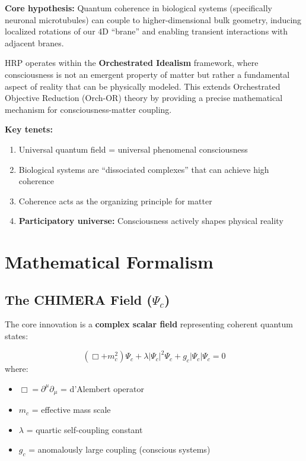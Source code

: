 \begin{keyconcept}
\textbf{Core hypothesis:} Quantum coherence in biological systems (specifically neuronal microtubules) can couple to higher-dimensional bulk geometry, inducing localized rotations of our 4D ``brane'' and enabling transient interactions with adjacent branes.
\end{keyconcept}

HRP operates within the \textbf{Orchestrated Idealism} framework, where consciousness is not an emergent property of matter but rather a fundamental aspect of reality that can be physically modeled. This extends Orchestrated Objective Reduction (Orch-OR) theory by providing a precise mathematical mechanism for consciousness-matter coupling.

\textbf{Key tenets:}
\begin{enumerate}
\item Universal quantum field = universal phenomenal consciousness
\item Biological systems are ``dissociated complexes'' that can achieve high coherence
\item Coherence acts as the organizing principle for matter
\item \textbf{Participatory universe:} Consciousness actively shapes physical reality
\end{enumerate}

\section{Mathematical Formalism}
\label{sec:hrp-math}

\subsection{The CHIMERA Field ($\Psi_c$)}
\label{subsec:chimera-field}

The core innovation is a \textbf{complex scalar field} representing coherent quantum states:

\begin{equation}
\label{eq:chimera-klein-gordon}
\left(\Box + m_c^2\right)\Psi_c + \lambda|\Psi_c|^2\Psi_c + g_c|\Psi_c|\Psi_c = 0
\end{equation}
where:
\begin{itemize}
\item $\Box = \partial^\mu\partial_\mu$ = d'Alembert operator
\item $m_c$ = effective mass scale
\item $\lambda$ = quartic self-coupling constant
\item $g_c$ = anomalously large coupling (conscious systems)
\end{itemize}

